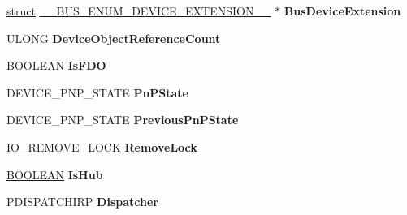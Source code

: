 \begin{DoxyCompactItemize}
\begin{tabbing}
\end{tabbing}\item 
\mbox{\label{struct_c_o_m_m_o_n___d_e_v_i_c_e___e_x_t_e_n_s_i_o_n_a5d320698cfd6136237df9d2af49bb8f1}} 
\hyperlink{interfacestruct}{struct} \hyperlink{struct_____b_u_s___e_n_u_m___d_e_v_i_c_e___e_x_t_e_n_s_i_o_n____}{\+\_\+\+\_\+\+B\+U\+S\+\_\+\+E\+N\+U\+M\+\_\+\+D\+E\+V\+I\+C\+E\+\_\+\+E\+X\+T\+E\+N\+S\+I\+O\+N\+\_\+\+\_\+} $\ast$ {\bfseries Bus\+Device\+Extension}
\item 
\mbox{\label{struct_c_o_m_m_o_n___d_e_v_i_c_e___e_x_t_e_n_s_i_o_n_a0dff420cdd76050e3db143675c7dfc24}} 
U\+L\+O\+NG {\bfseries Device\+Object\+Reference\+Count}
\item 
\mbox{\label{struct_c_o_m_m_o_n___d_e_v_i_c_e___e_x_t_e_n_s_i_o_n_aac2ee0230a897b0aee50aeecfaa954e0}} 
\hyperlink{_processor_bind_8h_a112e3146cb38b6ee95e64d85842e380a}{B\+O\+O\+L\+E\+AN} {\bfseries Is\+F\+DO}
\item 
\mbox{\label{struct_c_o_m_m_o_n___d_e_v_i_c_e___e_x_t_e_n_s_i_o_n_af5f255e0e7159b52da576aa0ad77ee9c}} 
D\+E\+V\+I\+C\+E\+\_\+\+P\+N\+P\+\_\+\+S\+T\+A\+TE {\bfseries Pn\+P\+State}
\item 
\mbox{\label{struct_c_o_m_m_o_n___d_e_v_i_c_e___e_x_t_e_n_s_i_o_n_a4229841a1bb478ad6f9534f33da31d03}} 
D\+E\+V\+I\+C\+E\+\_\+\+P\+N\+P\+\_\+\+S\+T\+A\+TE {\bfseries Previous\+Pn\+P\+State}
\item 
\mbox{\label{struct_c_o_m_m_o_n___d_e_v_i_c_e___e_x_t_e_n_s_i_o_n_aaaef470cb4133607f812c6dc00ee8d9b}} 
\hyperlink{struct___i_o___r_e_m_o_v_e___l_o_c_k}{I\+O\+\_\+\+R\+E\+M\+O\+V\+E\+\_\+\+L\+O\+CK} {\bfseries Remove\+Lock}
\item 
\mbox{\label{struct_c_o_m_m_o_n___d_e_v_i_c_e___e_x_t_e_n_s_i_o_n_a389f3ea9c119d736e0f368500a0f73f4}} 
\hyperlink{_processor_bind_8h_a112e3146cb38b6ee95e64d85842e380a}{B\+O\+O\+L\+E\+AN} {\bfseries Is\+Hub}
\item 
\mbox{\label{struct_c_o_m_m_o_n___d_e_v_i_c_e___e_x_t_e_n_s_i_o_n_ac33a2a0b8dc2459c539755b9f771def0}} 
P\+D\+I\+S\+P\+A\+T\+C\+H\+I\+RP {\bfseries Dispatcher}
\end{DoxyCompactItemize}


